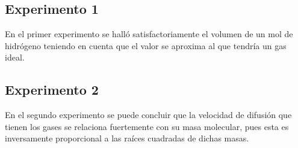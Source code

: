 \documentclass[../main.tex]{subfiles}
\begin{document}
    \subsection{Experimento 1}
    \item En el primer experimento se halló satisfactoriamente el volumen de un mol 
    de hidrógeno teniendo en cuenta
    que el valor se aproxima al que tendría un gas ideal.
    \subsection{Experimento 2}
    \item En el segundo experimento se puede concluir que la velocidad de difusión que
    tienen los gases se relaciona fuertemente con su masa molecular, pues esta
    es inversamente proporcional a las raíces cuadradas de dichas masas.
\end{document}

